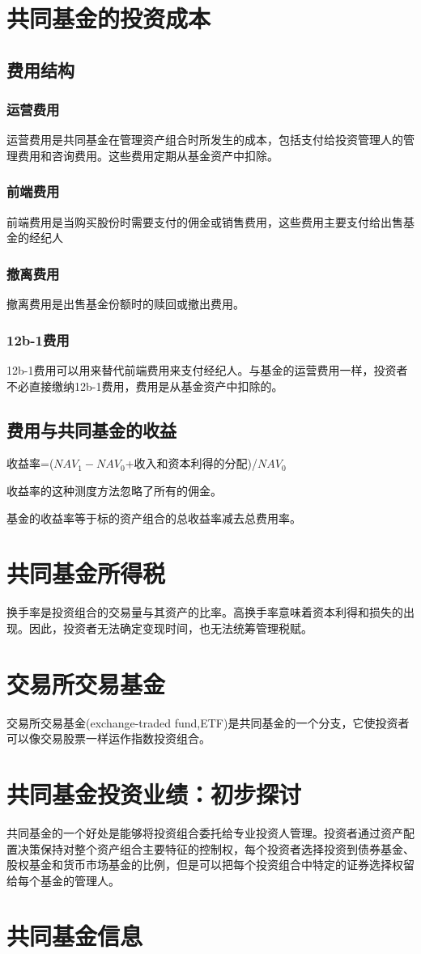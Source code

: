 \documentclass{article}
\begin{document}
\section{共同基金的投资成本}
\subsection{费用结构}
\subsubsection{运营费用}
运营费用是共同基金在管理资产组合时所发生的成本，包括支付给投资管理人的管理费用和咨询费用。这些费用定期从基金资产中扣除。
\subsubsection{前端费用}
前端费用是当购买股份时需要支付的佣金或销售费用，这些费用主要支付给出售基金的经纪人
\subsubsection{撤离费用}
撤离费用是出售基金份额时的赎回或撤出费用。
\subsubsection{12b-1费用}
12b-1费用可以用来替代前端费用来支付经纪人。与基金的运营费用一样，投资者不必直接缴纳12b-1费用，费用是从基金资产中扣除的。
\subsection{费用与共同基金的收益}
收益率=($ NAV_1-NAV_0 $+收入和资本利得的分配)/$ NAV_0 $

收益率的这种测度方法忽略了所有的佣金。

基金的收益率等于标的资产组合的总收益率减去总费用率。
\section{共同基金所得税}
换手率是投资组合的交易量与其资产的比率。高换手率意味着资本利得和损失的出现。因此，投资者无法确定变现时间，也无法统筹管理税赋。
\section{交易所交易基金}
交易所交易基金(exchange-traded fund,ETF)是共同基金的一个分支，它使投资者可以像交易股票一样运作指数投资组合。
\section{共同基金投资业绩：初步探讨}
共同基金的一个好处是能够将投资组合委托给专业投资人管理。投资者通过资产配置决策保持对整个资产组合主要特征的控制权，每个投资者选择投资到债券基金、股权基金和货币市场基金的比例，但是可以把每个投资组合中特定的证券选择权留给每个基金的管理人。
\section{共同基金信息}
\end{document}
